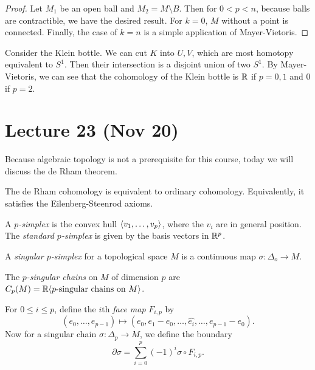 \documentclass[twoside, 10pt]{article}
\begin{document}
    \begin{proof} Let $M_1$ be an open ball and $M_2 = M \setminus B$. Then for
        $0 < p < n$, because balls are contractible, we have the desired
        result. For $k=0$, $M$ without a point is connected. Finally, the case
        of $k=n$ is a simple application of Mayer-Vietoris.  \end{proof}

    \begin{exm} Consider the Klein bottle. We can cut $K$ into $U,V$, which are
        most homotopy equivalent to $S^1$. Then their intersection is a
        disjoint union of two $S^1$. By Mayer-Vietoris, we can see that the
        cohomology of the Klein bottle is $\mathbb{R}$ if $p = 0,1$ and $0$ if $p=2$.
    \end{exm}

    \section{Lecture 23 (Nov 20)}%
    
    Because algebraic topology is not a prerequisite for this course, today we
    will discuss the de Rham theorem. 

    \begin{thm} The de Rham cohomology is equivalent to ordinary cohomology.
    Equivalently, it satisfies the Eilenberg-Steenrod axioms.  \end{thm}

    \begin{defn} A \textit{$p$-simplex} is the convex hull $\langle v_1, \ldots,
    v_p\rangle$, where the $v_i$ are in general position. The \textit{standard
    $p$-simplex} is given by the basis vectors in $\mathbb{R}^p$.  \end{defn}

    \begin{defn} A \textit{singular $p$-simplex} for a topological space $M$ is
    a continuous map $\sigma: \Delta_o \to M$.  \end{defn}

    \begin{defn} The \textit{$p$-singular chains} on $M$ of dimension $p$ are
    $C_p(M) = \mathbb{R} \langle p\text{-singular chains on }M\rangle$.  \end{defn}

    For $0 \leq i \leq p$, define the $i$th \textit{face map} $F_{i,p}$ by
    \[(e_0, \ldots, e_{p-1}) \mapsto (e_0, e_1-e_0, \ldots, \widehat{e_i},
    \ldots, e_{p-1}-e_0).\] Now for a singular chain $\sigma:\Delta_p \to M$,
    we define the boundary \[\partial \sigma = \sum_{i=0}^p (-1)^i \sigma \circ
    F_{i,p}.\]
\end{document}
